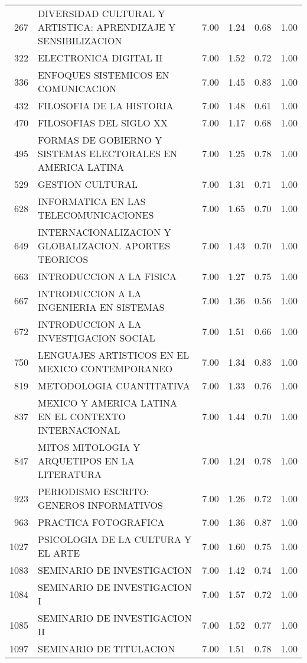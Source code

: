 \begin{table}[ht]
\begin{tabular}{rlrrrr}
  267 & DIVERSIDAD CULTURAL Y ARTISTICA: APRENDIZAJE Y SENSIBILIZACION & 7.00 & 1.24 & 0.68 & 1.00 \\ 
  322 & ELECTRONICA DIGITAL II & 7.00 & 1.52 & 0.72 & 1.00 \\ 
  336 & ENFOQUES SISTEMICOS EN COMUNICACION & 7.00 & 1.45 & 0.83 & 1.00 \\ 
  432 & FILOSOFIA DE LA HISTORIA & 7.00 & 1.48 & 0.61 & 1.00 \\ 
  470 & FILOSOFIAS DEL SIGLO XX & 7.00 & 1.17 & 0.68 & 1.00 \\ 
  495 & FORMAS DE GOBIERNO Y SISTEMAS ELECTORALES EN AMERICA LATINA & 7.00 & 1.25 & 0.78 & 1.00 \\ 
  529 & GESTION CULTURAL & 7.00 & 1.31 & 0.71 & 1.00 \\ 
  628 & INFORMATICA EN LAS TELECOMUNICACIONES & 7.00 & 1.65 & 0.70 & 1.00 \\ 
  649 & INTERNACIONALIZACION Y GLOBALIZACION. APORTES TEORICOS & 7.00 & 1.43 & 0.70 & 1.00 \\ 
  663 & INTRODUCCION A LA FISICA & 7.00 & 1.27 & 0.75 & 1.00 \\ 
  667 & INTRODUCCION A LA INGENIERIA EN SISTEMAS & 7.00 & 1.36 & 0.56 & 1.00 \\ 
  672 & INTRODUCCION A LA INVESTIGACION SOCIAL & 7.00 & 1.51 & 0.66 & 1.00 \\ 
  750 & LENGUAJES ARTISTICOS EN EL MEXICO CONTEMPORANEO & 7.00 & 1.34 & 0.83 & 1.00 \\ 
  819 & METODOLOGIA CUANTITATIVA & 7.00 & 1.33 & 0.76 & 1.00 \\ 
  837 & MEXICO Y AMERICA LATINA EN EL CONTEXTO INTERNACIONAL & 7.00 & 1.44 & 0.70 & 1.00 \\ 
  847 & MITOS MITOLOGIA Y ARQUETIPOS EN LA LITERATURA & 7.00 & 1.24 & 0.78 & 1.00 \\ 
  923 & PERIODISMO ESCRITO: GENEROS INFORMATIVOS & 7.00 & 1.26 & 0.72 & 1.00 \\ 
  963 & PRACTICA FOTOGRAFICA & 7.00 & 1.36 & 0.87 & 1.00 \\ 
  1027 & PSICOLOGIA DE LA CULTURA Y EL ARTE & 7.00 & 1.60 & 0.75 & 1.00 \\ 
  1083 & SEMINARIO DE INVESTIGACION & 7.00 & 1.42 & 0.74 & 1.00 \\ 
  1084 & SEMINARIO DE INVESTIGACION I & 7.00 & 1.57 & 0.72 & 1.00 \\ 
  1085 & SEMINARIO DE INVESTIGACION II & 7.00 & 1.52 & 0.77 & 1.00 \\ 
  1097 & SEMINARIO DE TITULACION & 7.00 & 1.51 & 0.78 & 1.00 \\ 

\end{tabular}
\end{table}
